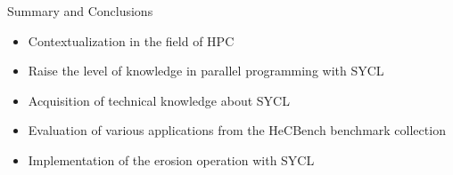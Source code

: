 \begin{frame}{Summary and Conclusions}
  \begin{itemize}
    \item Contextualization in the field of HPC
    \item Raise the level of knowledge in parallel programming with SYCL
    \item Acquisition of technical knowledge about SYCL
    \item Evaluation of various applications from the HeCBench benchmark collection
    \item Implementation of the erosion operation with SYCL
  \end{itemize}
\endblock{}    
\end{frame}

